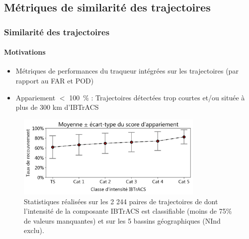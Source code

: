 \documentclass[aspectratio=169, usepdftitle=false, xcolor={dvipsnames}, 9pt,table]{beamer}
\begin{document}
\subsection[Similarité des trajectoires]{Métriques de similarité des trajectoires}
\makesubsecslide
\begin{frame}[c]
    \frametitle{Similarité des trajectoires}
    \framesubtitle{Motivations}
    \small
    \vspace{1em}
    \begin{definition}
        \begin{itemize}
            \item Métriques de performances du traqueur \alert{intégrées} sur les trajectoires (par rapport au FAR et POD)
            \item Appariement $<$ 100~\% : Trajectoires détectées trop courtes \alert{et/ou} située à plus de 300 km d'IBTrACS
        \end{itemize}
    \end{definition}
    \begin{figure}
        \centering
        \includegraphics[height=4cm]{Figures/coverage_ratio.png}
        \captionsetup{width=0.75\textwidth}
        \caption{\scriptsize Statistiques réalisées sur les 2 244 paires de trajectoires de \cite{dulac_assessing_2023} dont l'intensité de la composante IBTrACS est
        classifiable (moins de 75\% de valeurs manquantes) et sur les 5 bassins géographiques (NInd exclu).}
    \end{figure}
\end{frame}
\end{document}
